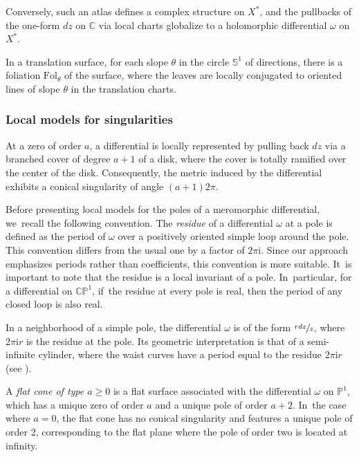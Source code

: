 \documentclass[JEP,XML,SOM,Unicode,NoFloatCountersInSection,published]{cedram}
\newcommand\PP{{\mathbb P}}
\theoremstyle{definition}
\begin{document}
Conversely, such an atlas defines a complex structure on $X^{\ast}$, and the pullbacks of the one-form $dz$ on $\mathbb{C}$ via local charts globalize to a holomorphic differential $\omega$ on $X^{\ast}$.

In a translation surface, for each slope $\theta$ in the circle $\mathbb{S}^{1}$ of directions, there is a foliation $\mathrm{Fol}_{\theta}$ of the surface, where the leaves are locally conjugated to oriented lines of slope $\theta$ in the translation charts.

\subsubsection{Local models for singularities}

At a zero of order $a$, a differential is locally represented by pulling back $dz$ via a branched cover of degree $a+1$ of a disk, where the cover is totally ramified over the center of the disk. Consequently, the metric induced by the differential exhibits a conical singularity of angle $(a+1)2\pi$.

Before presenting local models for the poles of a meromorphic differential, we~recall the following convention. The \textit{residue} of a differential $\omega$ at a pole is defined as the period of $\omega$ over a positively oriented simple loop around the pole. This convention differs from the usual one by a factor of $2\pi \mathrm{i}$. Since our approach emphasizes periods rather than coefficients, this convention is more suitable. It~is important to note that the residue is a local invariant of a pole. In~particular, for a differential on $\mathbb{CP}^{1}$, if~the residue at every pole is real, then the period of any closed loop is also real.

In a neighborhood of a simple pole, the differential $\omega$ is of the form $\sfrac{rdz}{z}$, where $2\pi \mathrm{i} r$ is the residue at the pole. Its geometric interpretation is that of a semi-infinite cylinder, where the waist curves have a period equal to the residue $2\pi \mathrm{i} r$ (see \cite[\S2.2]{Bo}).

A {\em flat cone of type $a\geq0$} is a flat surface associated with the differential $\omega$ on $\PP^{1}$, which has a unique zero of order $a$ and a unique pole of order $a+2$. In~the case where $a=0$, the flat cone has no conical singularity and features a unique pole of order $2$, corresponding to the flat plane where the pole of order two is located at infinity.
\end{document}
